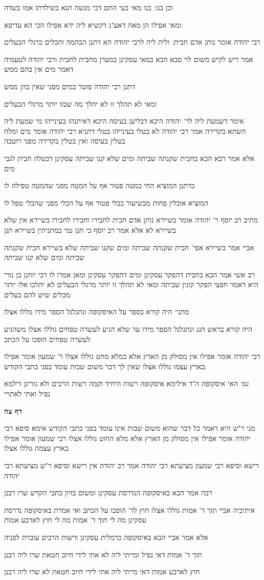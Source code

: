 \documentclass[12pt, openany]{book}
\newcommand{\sethebfont}{
\fontsize{10.5pt}{21.0pt} \selectfont
}
\newcommand{\textblock}[1]{
{\sethebfont #1\\}	
}
\newcommand{\sectname}{}
\newcommand{\newsection}[1]{
	\addcontentsline{toc}{section}{#1}
	\renewcommand{\sectname}{#1}	
	\vspace{-\baselineskip}
	\begin{center}
		\textbf{%
\fontsize{16pt}{16pt}\selectfont
			#1}
	\end{center}
	\vspace{-\baselineskip}
	\nopagebreak
}
\begin{document}
\textblock{וכן בנו: בנו מאי בעי התם דבי מנשה תנא בשילדתו אמו בשדה}
\textblock{ומאי אפילו הן מאה דאע"ג דקשיא ליה ידא אפילו הכי הא עדיפא:}
\textblock{רבי יהודה אומר נותן אדם חבית: ולית ליה לרבי יהודה הא דתנן הבהמה והכלים כרגלי הבעלים}
\textblock{אמר ריש לקיש משום לוי סבא הכא במאי עסקינן במערן מחבית לחבית ורבי יהודה לטעמיה דאמר מים אין בהם ממש}
\textblock{דתנן רבי יהודה פוטר במים מפני שאין בהן ממש}
\textblock{ומאי לא תהלך זו לא יהלך מה שבזו יותר מרגלי הבעלים}
\textblock{אימר דשמעת ליה לר' יהודה היכא דבליען בעיסה היכא דאיתנהו בעינייהו מי שמעת ליה השתא בקדירה אמר רבי יהודה לא בטלי בעינייהו בטלי דתניא רבי יהודה אומר מים ומלח בטלין בעיסה ואין בטלין בקדירה מפני רוטבה}
\textblock{אלא אמר רבא הכא בחבית שקנתה שביתה ומים שלא קנו שביתה עסקינן דבטלה חבית לגבי מים}
\textblock{כדתנן המוציא החי במטה פטור אף על המטה מפני שהמטה טפילה לו}
\textblock{המוציא אוכלין פחות מכשיעור בכלי פטור אף על הכלי מפני שהכלי טפל לו}
\textblock{מתיב רב יוסף ר' יהודה אומר בשיירא נותן אדם חבית לחבירו וחבירו לחבירו בשיירא אין שלא בשיירא לא אלא אמר רב יוסף כי תנן נמי במתניתין בשיירא תנן}
\textblock{אביי אמר בשיירא אפי' חבית שקנתה שביתה ומים שקנו שביתה שלא בשיירא חבית שקנתה שביתה ומים שלא קנו שביתה}
\textblock{רב אשי אמר הכא בחבית דהפקר עסקינן ומים דהפקר עסקינן ומאן אמרו לו רבי יוחנן בן נורי היא דאמר חפצי הפקר קונין שביתה ומאי לא תהלך זו יותר מרגלי הבעלים לא יהלכו אלו יותר מכלים שיש להם בעלים:}
\textblock{{\large\emph{מתני׳}} היה קורא בספר על האיסקופה ונתגלגל הספר מידו גוללו אצלו}
\textblock{היה קורא בראש הגג ונתגלגל הספר מידו עד שלא הגיע לעשרה טפחים גוללו אצלו משהגיע לעשרה טפחים הופכו על הכתב}
\textblock{רבי יהודה אומר אפילו אין מסולק מן הארץ אלא כמלא מחט גוללו אצלו ר' שמעון אומר אפילו בארץ עצמו גוללו אצלו שאין לך דבר משום שבות עומד בפני כתבי הקודש:}
\textblock{{\large\emph{גמ׳}} האי איסקופה ה"ד אילימא איסקופה רשות היחיד וקמה רשות הרבים ולא גזרינן דילמא נפיל ואתי לאתויי}
\newsection{דף צח}
\textblock{מני ר"ש היא דאמר כל דבר שהוא משום שבות אינו עומד בפני כתבי הקודש אימא סיפא רבי יהודה אומר אפילו אין מסולק מן הארץ אלא מלא החוט גוללו אצלו רבי שמעון אומר אפילו בארץ עצמה גוללו אצלו}
\textblock{רישא וסיפא רבי שמעון מציעתא רבי יהודה אמר רב יהודה אין רישא וסיפא ר"ש מציעתא רבי יהודה}
\textblock{רבה אמר הכא באיסקופה הנדרסת עסקינן ומשום בזיון כתבי הקדש שרו רבנן}
\textblock{איתיביה אביי תוך ד' אמות גוללו אצלו חוץ לד' הופכו על הכתב ואי אמרת באיסקופה נדרסת עסקינן מה לי תוך ד' אמות מה לי חוץ לארבע אמות}
\textblock{אלא אמר אביי הכא באיסקופה כרמלית עסקינן ורשות הרבים עוברת לפניה}
\textblock{תוך ד' אמות דאי נפיל ומייתי ליה לא אתי לידי חיוב חטאת שרו ליה רבנן}
\textblock{חוץ לארבע אמות דאי מייתי ליה אתי לידי חיוב חטאת לא שרו ליה רבנן}
\end{document}
